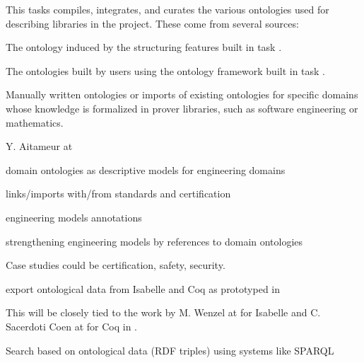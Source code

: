 \begin{workpackage}[id=structuring,wphases=0-48,type=RTD,
  short=Structured Theories and Metadata,%
  title=Structured Theories and Metadata,
  lead=Fau,
  BolRM=6,
  TumRM=6,
  FauRM=48,
  SacRM=48]
\begin{tasklist}
\begin{task}[id=strrefonto,title=Reference Ontology,lead=Fau,FauRM=6,SacRM=6]
This tasks compiles, integrates, and curates the various ontologies used for describing libraries in the project.
These come from several sources:
\begin{compactitem}
 \item The ontology induced by the structuring features built in task .
 \item The ontologies built by users using the ontology framework built in task .
 \item Manually written ontologies or imports of existing ontologies for specific domains whose knowledge is formalized in prover libraries, such as software engineering or mathematics.
\end{compactitem}
\end{task} 

\begin{task}[id=strdomonto,title= Domain Ontologies Ontologies for Formal Methods in SE,lead=Tou,TouRM=12, SacRM=6]
Y. Aitameur at 
\begin{compactitem}
\item domain ontologies as descriptive models for engineering domains 
\item links/imports with/from standards and certification
\item engineering models annotations
\item strengthening engineering models by references to domain ontologies
\item Case studies could be certification, safety, security.
\end{compactitem}
\end{task} 

\begin{task}[id=strontorepml,title=Ontolgocial Representation for Major Libraries,lead=Fau,FauRM=6,BolRM=6,TumRM=6,SacRM=6]
export ontological data from Isabelle and Coq as prototyped in \cite{ulo}

This will be closely tied to the work by M. Wenzel at  for Isabelle and C. Sacerdoti Coen at  for Coq in .
\end{task} 

\begin{task}[id=strontosearch,title=Ontological Search,lead=Fau,FauRM=12,SacRM=6]
Search based on ontological data (RDF triples) using systems like SPARQL
\end{task} 


\end{tasklist}
\end{workpackage}
